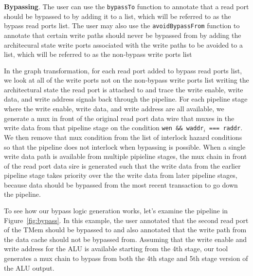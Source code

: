{\bf Bypassing}. 
The user can use the {\tt bypassTo} function to annotate that a read port should be bypassed to by adding it to a list, which will be referred to as the bypass read ports list. The user may also use the {\tt avoidBypassFrom} function to annotate that certain write paths should never be bypassed from by adding the architecural state write ports associated with the write paths to be avoided to a list, which will be referred to as the non-bypass write ports list

In the graph transformation, for each read port added to bypass read ports
list, we look at all of the write ports not on the non-bypass write
ports list writing the architectural state the read port is attached
to and trace the write enable, write data, and write address signals
back through the pipeline. For each pipeline stage where the write
enable, write data, and write address are all available, we generate a mux in front of the original read port data wire that muxes in the write data from that pipeline stage on the condition {\tt wen \&\& waddr$_i$ === raddr}. We then remove that mux
condition from the list of interlock hazard conditions so that the
pipeline does not interlock when bypassing is possible. When a single write data path is available from multiple pipieline stages, the mux chain in front of the read port data sire is generated such that the write data from the earlier pipeline stage takes priority over the the write data from later pipeline stages, because data should be bypassed from the most recent transaction to go down the pipeline.

To see how our bypass logic generation works, let's examine the pipeline in Figure~\ref{fig:bypass}. In this example, the user annotated that the second read port of the TMem should be bypassed to and also annotated that the write path from the data cache should not be bypassed from. Assuming that the write enable and write address for the ALU is available starting from the 4th stage, our tool generates a mux chain to bypass from both the 4th stage and 5th stage version of the ALU output.
